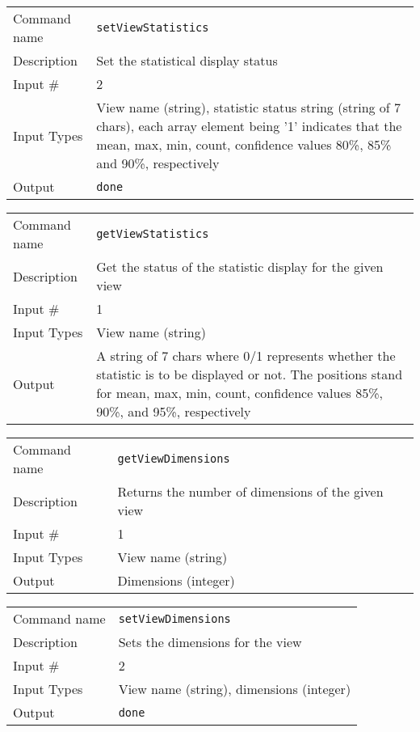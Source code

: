 \bigskip

\noindent
\begin{tabular}{l|p{5in}}
\hline
Command name & {\tt setViewStatistics} \\
Description  & Set the statistical display status \\
Input \#     & 2 \\
Input Types  & View name (string), statistic status string (string
               of 7 chars), each array element being '1' indicates
               that the mean, max, min, count, confidence values 80\%,
               85\% and 90\%, respectively \\
Output       & {\tt done} \\
\hline
\end{tabular}

\bigskip

\noindent
\begin{tabular}{l|p{5in}}
\hline
Command name & {\tt getViewStatistics} \\
Description  & Get the status of the statistic display for the given view \\
Input \#     & 1 \\
Input Types  & View name (string) \\
Output       & A string of 7 chars where 0/1 represents whether the
               statistic is to be displayed or not. The positions stand for
               mean, max, min, count, confidence values 85\%, 90\%, and 95\%,
               respectively \\
\hline
\end{tabular}

\bigskip

\noindent
\begin{tabular}{l|p{5in}}
\hline
Command name & {\tt getViewDimensions} \\
Description  & Returns the number of dimensions of the given view \\
Input \#     & 1 \\
Input Types  & View name (string) \\
Output       & Dimensions (integer) \\
\hline
\end{tabular}

\bigskip

\noindent
\begin{tabular}{l|p{5in}}
\hline
Command name & {\tt setViewDimensions} \\
Description  & Sets the dimensions for the view \\
Input \#     & 2 \\
Input Types  & View name (string), dimensions (integer) \\
Output       & {\tt done} \\
\hline
\end{tabular}

